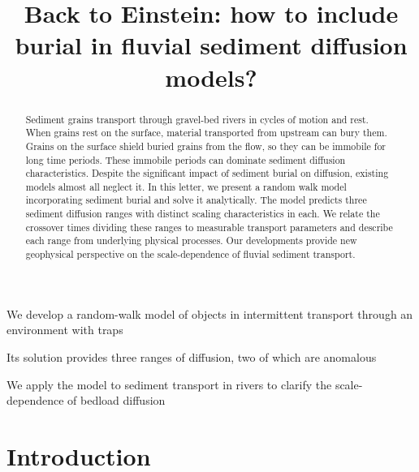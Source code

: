 \documentclass[]{agujournal2018}
\begin{document}
\title{Back to Einstein: how to include burial in fluvial sediment diffusion models?}


\begin{keypoints}
\item We develop a random-walk model of objects in intermittent transport through an environment with traps
\item Its solution provides three ranges of diffusion, two of which are anomalous
\item We apply the model to sediment transport in rivers to clarify the scale-dependence of bedload diffusion

\end{keypoints}

\begin{abstract}
Sediment grains transport through gravel-bed rivers in cycles of motion and rest.
When grains rest on the surface, material transported from upstream can bury them.
Grains on the surface shield buried grains from the flow, so they can be immobile for long time periods.
These immobile periods can dominate sediment diffusion characteristics. 
Despite the significant impact of sediment burial on diffusion, existing models almost all neglect it.
In this letter, we present a random walk model incorporating sediment burial and solve it analytically.
The model predicts three sediment diffusion ranges with distinct scaling characteristics in each.
We relate the crossover times dividing these ranges to measurable transport parameters and describe each range from underlying physical processes.
Our developments provide new geophysical perspective on the scale-dependence of fluvial sediment transport.
\end{abstract}

\section{Introduction}
\end{document}
